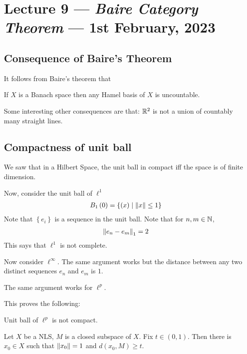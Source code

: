 \section{Lecture 9 --- \textit{Baire Category Theorem} --- 1st February, 2023}
\horz

\subsection{Consequence of Baire's Theorem}

It follows from Baire's theorem that
\begin{proposition}
    If $X$ is a Banach space then any Hamel basis of $X$ is uncountable.
    \label{prop:B-space-implies-uncountable-Hamel-basis}
\end{proposition}

Some interesting other consequences are that: $\mathbb R^{2}$ is not a union of countably many straight lines.

\subsection{Compactness of unit ball}

We saw that in a Hilbert Space, the unit ball in compact iff the space is of finite dimension.

Now, consider the unit ball of $\ell ^{1}$
\begin{align*}
    B_{1} \left( 0 \right) = \left\{ \left( x \right) \mid \left\lVert x \right\rVert \le 1 \right\}
\end{align*}
Note that $\left\{ e_{i} \right\}$ is a sequence in the unit ball. Note that for $n,m \in \mathbb N$,
\begin{align*}
    \left\lVert e_{n} - e_{m} \right\rVert_{1} =2
\end{align*}
This says that $\ell ^{1}$  is not complete.

Now consider $\ell ^{\infty}$. The same argument works but the distance between any two distinct sequences $e_{n}$ and $e_{m}$ is $1$.

The same argument works for $\ell ^{p}$.

This proves the following:
\begin{proposition}
    Unit ball of $\ell ^{p}$ is not compact.
\end{proposition}

\begin{proposition}
    Let $X$ be a NLS, $M$ is a closed subspace of $X$. Fix $t \in (0,1)$. Then there is $x_{0} \in X$ such that $\left\lVert x_{0} \right\rVert=1$ and $d\left( x_{0}, M \right) \ge t$.
\end{proposition}

